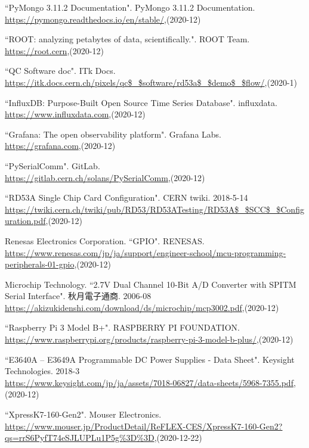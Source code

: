 \begin{thebibliography}{9}
``PyMongo 3.11.2 Documentation". PyMongo 3.11.2 Documentation.\\
\url{https://pymongo.readthedocs.io/en/stable/},(2020-12)

``ROOT: analyzing petabytes of data, scientifically.". ROOT Team.\\ 
\url{https://root.cern},(2020-12)

``QC Software doc". ITk Docs. \\
\url{https://itk.docs.cern.ch/pixels/qc$\_$software/rd53a$\_$demo$\_$flow/},(2020-1)

``InfluxDB: Purpose-Built Open Source Time Series Database". influxdata. \\
\url{https://www.influxdata.com},(2020-12)

``Grafana: The open observability platform". Grafana Labs. \\
\url{https://grafana.com},(2020-12)

``PySerialComm". GitLab. \\
\url{https://gitlab.cern.ch/solans/PySerialComm},(2020-12)

``RD53A Single Chip Card Configuration". CERN twiki. 2018-5-14 \\
\url{https://twiki.cern.ch/twiki/pub/RD53/RD53ATesting/RD53A$\_$SCC$\_$Configuration.pdf},(2020-12)

Renesas Electronics Corporation. ``GPIO". RENESAS.  \\
\url{https://www.renesas.com/jp/ja/support/engineer-school/mcu-programming-peripherals-01-gpio},(2020-12)

Microchip Technology. ``2.7V Dual Channel 10-Bit A/D Converter with SPITM Serial Interface". 秋月電子通商. 2006-08\\
\url{https://akizukidenshi.com/download/ds/microchip/mcp3002.pdf},(2020-12)

``Raspberry Pi 3 Model B+". RASPBERRY PI FOUNDATION. \\
\url{https://www.raspberrypi.org/products/raspberry-pi-3-model-b-plus/},(2020-12)

``E3640A – E3649A Programmable DC Power Supplies - Data Sheet". Keysight Technologies. 2018-3\\
\url{https://www.keysight.com/jp/ja/assets/7018-06827/data-sheets/5968-7355.pdf},(2020-12)

``XpressK7-160-Gen2". Mouser Electronics.\\
\url{https://www.mouser.jp/ProductDetail/ReFLEX-CES/XpressK7-160-Gen2?qs=rrS6PyfT74eSJLUPLu1P5g\%3D\%3D},(2020-12-22)


\end{thebibliography}
